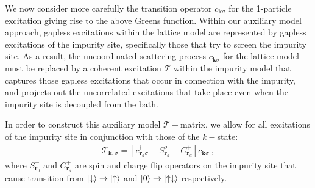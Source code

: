 We now consider more carefully the transition operator \(c_{{\bm k}\sigma}\) for the 1-particle excitation giving rise to the above Greens function. Within our auxiliary model approach, gapless excitations within the lattice model are represented by gapless excitations of the impurity site, specifically those that try to screen the impurity site. As a result, the uncoordinated scattering process \(c_{{\bm k}\sigma}\) for the lattice model must be replaced by a coherent excitation  \(\mathcal{T}\) within the impurity model that captures those gapless excitations that occur in connection with the impurity, and projects out the uncorrelated excitations that take place even when the impurity site is decoupled from the bath.

In order to construct this auxiliary model \(\mathcal{T}-\)matrix, we allow for all excitations of the impurity site in conjunction with those of the \(k-\)state:
\begin{equation}\begin{aligned}\label{tmatrix}
	\mathcal{T}_{{\bm k},\sigma} = \left[c^\dagger_{\bm r_d\sigma} + S_{\bm r_d}^\sigma + C_{\bm r_d}^+ \right]c_{{\bm k}\sigma}~,
\end{aligned}\end{equation}
where \(S_{\bm r_d}^+\) and \(C_{\bm r_d}^+\) are spin and charge flip operators on the impurity site that cause transition from \(\ket{\downarrow} \to \ket{\uparrow}\) and \(\ket{0} \to \ket{\uparrow \downarrow}\) respectively.


